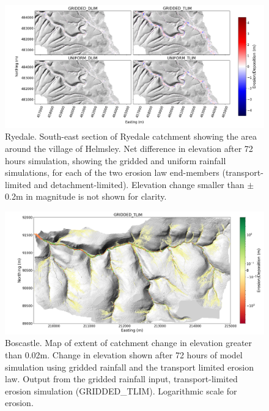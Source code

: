 \begin{figure}
\includegraphics[width=25cm]{chp06_figures_scripts/figure_ryedale_erosion_diff_ensemble.png}
\caption{Ryedale. South-east section of Ryedale catchment showing the area around the village of Helmsley. Net difference in elevation after 72 hours simulation, showing the gridded and uniform rainfall simulations, for each of the two erosion law end-members (transport-limited and detachment-limited). Elevation change smaller than \(\pm\) 0.2m in magnitude is not shown for clarity. }
\label{fig_ryedale_2dplan_erosion_ensemble}
\end{figure}

\begin{figure}
\includegraphics[width=25cm]{chp06_figures_scripts/boscastle_erodediff_grid_tlim.png}
\caption{Boscastle. Map of extent of catchment change in elevation greater than 0.02m. Change in elevation shown after 72 hours of model simulation using gridded rainfall and the transport limited erosion law. Output from the gridded rainfall input, transport-limited erosion simulation (GRIDDED\_TLIM). Logarithmic scale for erosion.}
\label{fig_boscastle_erodediff_grid_tlim}
\end{figure}

